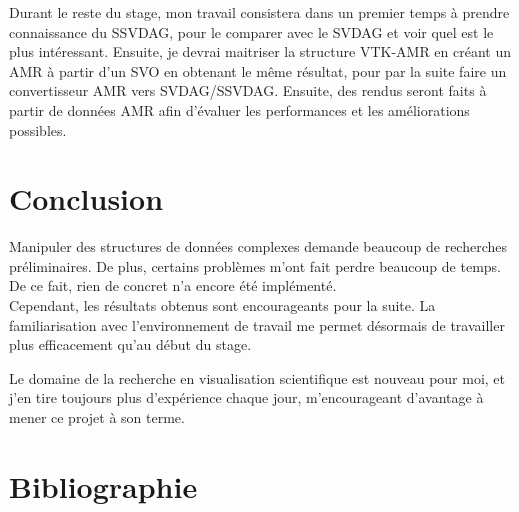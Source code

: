 \documentclass[12pt,a4paper,twoside]{article}
\begin{document}
    Durant le reste du stage, mon travail consistera dans un premier temps à prendre connaissance du SSVDAG, pour le
    comparer avec le SVDAG et voir quel est le plus intéressant. Ensuite, je devrai maitriser la structure VTK-AMR en créant un
    AMR à partir d'un SVO en obtenant le même résultat, pour par la suite faire un convertisseur AMR vers SVDAG/SSVDAG.
    Ensuite, des rendus seront faits à partir de données AMR afin d'évaluer les performances et les améliorations possibles.

    \newpage
    \section{Conclusion}                            %

    Manipuler des structures de données complexes demande beaucoup de recherches préliminaires. De plus, certains
    problèmes m'ont fait perdre beaucoup de temps. De ce fait, rien de concret n'a encore été implémenté.\\
    Cependant, les résultats obtenus sont encourageants pour la suite. La familiarisation avec l'environnement de travail
    me permet désormais de travailler plus efficacement qu'au début du stage.

    Le domaine de la recherche en visualisation scientifique est nouveau pour moi, et j'en tire toujours plus
    d'expérience chaque jour, m'encourageant d'avantage à mener ce projet à son terme.

    \newpage



    \newpage
    \section{Bibliographie}                         %

    
    \nocite{*}
\end{document}
